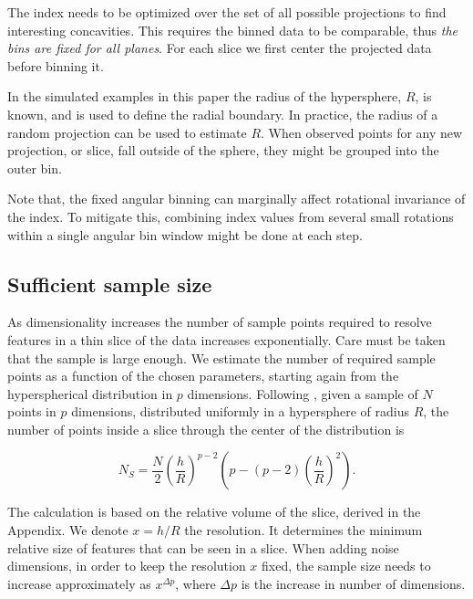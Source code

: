 \documentclass[]{interact}
\theoremstyle{plain}%
\theoremstyle{definition}
\theoremstyle{remark}
\begin{document}
The index needs to be optimized over the set of all possible projections
to find interesting concavities. This requires the binned data to be
comparable, thus \emph{the bins are fixed for all planes}. For each
slice we first center the projected data before binning it.

In the simulated examples in this paper the radius of the hypersphere,
\(R\), is known, and is used to define the radial boundary. In practice,
the radius of a random projection can be used to estimate \(R\). When
observed points for any new projection, or slice, fall outside of the
sphere, they might be grouped into the outer bin.

Note that, the fixed angular binning can marginally affect rotational
invariance of the index. To mitigate this, combining index values from
several small rotations within a single angular bin window might be done
at each step.

\hypertarget{sufficient-sample-size}{%
\subsection{\texorpdfstring{Sufficient sample size
\label{sec:size}}{Sufficient sample size }}\label{sufficient-sample-size}}

As dimensionality increases the number of sample points required to
resolve features in a thin slice of the data increases exponentially.
Care must be taken that the sample is large enough. We estimate the
number of required sample points as a function of the chosen parameters,
starting again from the hyperspherical distribution in \(p\) dimensions.
Following \citet{laa2019slice}, given a sample of \(N\) points in \(p\)
dimensions, distributed uniformly in a hypersphere of radius \(R\), the
number of points inside a slice through the center of the distribution
is

\begin{equation}
N_S = \frac{N}{2} \left(\frac{h}{R}\right)^{p-2} \left(p - (p-2)\left(\frac{h}{R}\right)^{2}\right).
\label{eq:count}
\end{equation}

\noindent The calculation is based on the relative volume of the slice,
derived in the Appendix. We denote \(x=h/R\) the resolution. It
determines the minimum relative size of features that can be seen in a
slice. When adding noise dimensions, in order to keep the resolution
\(x\) fixed, the sample size needs to increase approximately as
\(x^{\Delta p}\), where \(\Delta p\) is the increase in number of
dimensions.
\end{document}
